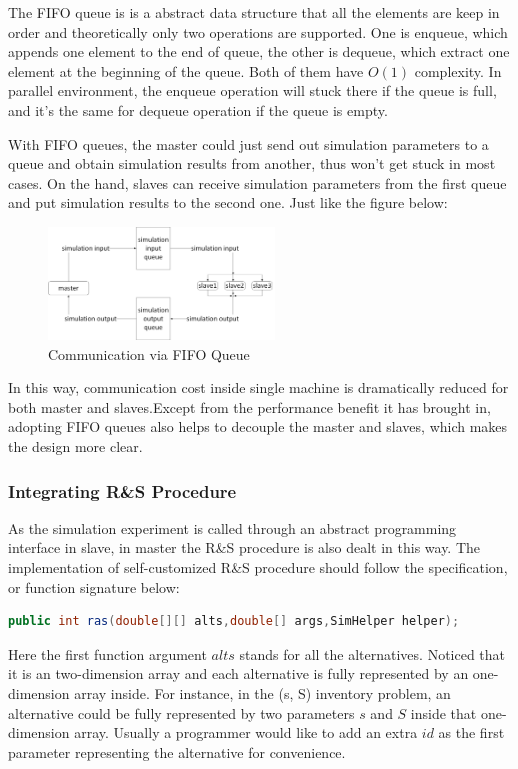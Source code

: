 The FIFO queue is is a abstract data structure that all the elements are keep in order and theoretically only two operations are supported. One is enqueue, which appends one element to the end of queue, the other is dequeue, which extract one element at the beginning of the queue. Both of them have $O(1)$ complexity. In parallel environment, the enqueue operation will stuck there if the queue is full, and it's the same for dequeue operation if the queue is empty.

With FIFO queues, the master could just send out simulation parameters to a queue and obtain simulation results from another, thus won't get stuck in most cases. On the hand, slaves can receive simulation parameters from the first queue and put simulation results to the second one. Just like the figure below:

\begin{figure}[ht]
\centering
\includegraphics[width=60mm]{master-slave-queue.png}
\caption{Communication via FIFO Queue}
\end{figure}

In this way, communication cost inside single machine is dramatically reduced for both master and slaves.Except from the performance benefit it has brought in, adopting FIFO queues also helps to decouple the master and slaves, which makes the design more clear.

\subsubsection{Integrating R\&S Procedure}

As the simulation experiment is called through an abstract programming interface in slave, in master the R\&S procedure is also dealt in this way. The implementation of self-customized R\&S procedure should follow the specification, or function signature below:

\begin{lstlisting}[language=Java]
public int ras(double[][] alts,double[] args,SimHelper helper);
\end{lstlisting}

Here the first function argument $alts$ stands for all the alternatives. Noticed that it is an two-dimension array and each alternative is fully represented by an one-dimension array inside. For instance, in the (s, S) inventory problem, an alternative could be fully represented by two parameters $s$ and $S$ inside that one-dimension array. Usually a programmer would like to add an extra $id$ as the first parameter representing the alternative for convenience.

